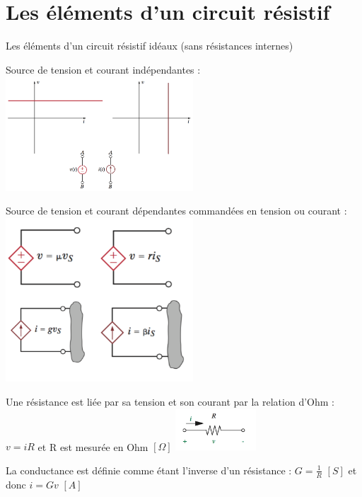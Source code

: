 \documentclass[11pt]{report}
\begin{document}
\section{Les éléments d'un circuit résistif}
Les éléments d'un circuit résistif idéaux (sans résistances internes)
\begin{framed}
   Source de tension et courant indépendantes : \newline
  \includegraphics[width=7cm]{2.png}\newline

   Source de tension et courant dépendantes commandées en tension ou courant : \newline
  \includegraphics[width=7cm]{3.png}\newline

   Une résistance est liée par sa tension et son courant par la relation d'Ohm : $v = iR$ et R est mesurée en Ohm $\left[ \Omega \right]$ \newline
  \includegraphics[width=3cm]{6.png}\newline

   La conductance est définie comme étant l'inverse d'un résistance : $G = \frac{1}{R}$  $\left[ S \right]$  et donc $i = Gv$ $ \left[ A \right]$ \newline


\end{framed}
\end{document}
